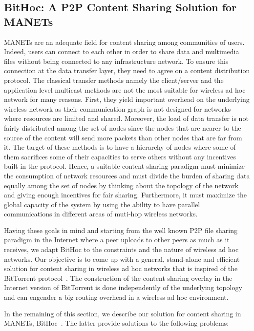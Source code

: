 \subsection{BitHoc: A P2P Content Sharing Solution for MANETs}

MANETs are an adequate field for content sharing among communities of users. Indeed, users can connect to each other in order to share data and multimedia files without being connected to any infrastructure network. To ensure this connection at the data transfer layer, they need to agree on a content distribution protocol. The classical transfer methods namely the client/server and the application level multicast methods are not the most suitable for wireless ad hoc network for many reasons. First, they yield important overhead on the underlying wireless network as their communication graph is not designed for networks where resources are limited and shared. Moreover, the load of data transfer is not fairly distributed among the set of nodes since the nodes that are nearer to the source of the content will send more packets than other nodes that are far from it. The target of these methods is to have a hierarchy of nodes where some of them sacrifices some of their capacities to serve others without any incentives built in the protocol. 
Hence, a suitable content sharing paradigm must minimize the consumption of network resources and must divide the burden of sharing data equally among the set of nodes by thinking about the topology of the network and giving enough incentives for fair sharing. Furthermore, it must maximize the global capacity of the system by using the ability to have parallel communications in different areas of muti-hop wireless networks.

Having these goals in mind and starting from the well known P2P file sharing paradigm in the Internet where a peer uploads to other peers as much as it receives, we adapt BitHoc to the constraints and the nature of wireless ad hoc networks. Our objective is to come up with a general, stand-alone and efficient solution for content sharing in wireless ad hoc networks that is inspired of the BitTorrent protocol~\cite{RefBT}. The construction of the content sharing overlay in the Internet version of BitTorrent is done independently of the underlying topology and can engender a big routing overhead in a wireless ad hoc environment.

In the remaining of this section, we describe our solution for content sharing in MANETs, BitHoc~\cite{BitHoc, BitHocWeb}. The latter provide solutions to the following problems:

